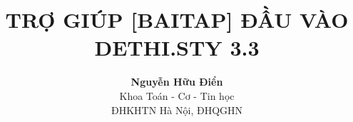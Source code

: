 \documentclass[12pt]{article}
\begin{document}
\soanthao

\title{\bf TRỢ GIÚP [BAITAP] ĐẦU VÀO  DETHI.STY 3.3} %
\author{{\bf Nguyễn Hữu Điển}\\
Khoa Toán - Cơ - Tin học\\
ĐHKHTN Hà Nội, ĐHQGHN
} %
\date{} %

\maketitle

\end{document}
